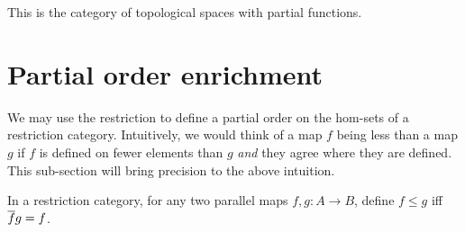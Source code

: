 \begin{example}[\topcatp]\label{ex:restriction_category_top}
  This is the category of topological spaces with partial functions.
\end{example}

\section{Partial order enrichment} %
\label{sub:enrichment_in_restriction_categories}

We may use the restriction to define a partial order on the hom-sets of a restriction
category. Intuitively, we would think of a map $f$ being less than a map $g$ if $f$ is
defined on fewer elements than $g$ \emph{and} they agree where they are defined. This sub-section
will bring precision to the above intuition.


\begin{definition}\label{def:restriction_category_hom_set_ordering}
  In a restriction category, for any two parallel maps  $f,g:A\to B$, define $f \le g$ iff
  $\overline{f} g = f$.
\end{definition}

